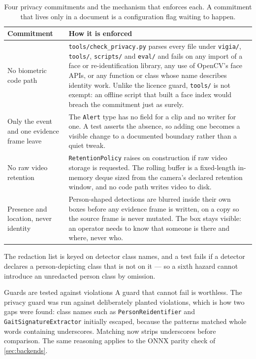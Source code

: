 \begin{table}[htbp]
\centering\small
\caption{Four privacy commitments and the mechanism that enforces each. A
commitment that lives only in a document is a configuration flag waiting to
happen.}
\label{tab:privacy}
\begin{tabularx}{\textwidth}{p{4.1cm} L}
\toprule
Commitment & How it is enforced \\
\midrule
No biometric code path &
\texttt{tools/check\_privacy.py} parses every file under \texttt{vigia/},
\texttt{tools/}, \texttt{scripts/} and \texttt{eval/} and fails on any import
of a face or re-identification library, any use of OpenCV's face APIs, or any
function or class whose name describes identity work. Unlike the licence
guard, \texttt{tools/} is not exempt: an offline script that built a face
index would breach the commitment just as surely. \\
\addlinespace
Only the event and one evidence frame leave &
The \texttt{Alert} type has no field for a clip and no writer for one. A test
asserts the absence, so adding one becomes a visible change to a documented
boundary rather than a quiet tweak. \\
\addlinespace
No raw video retention &
\texttt{RetentionPolicy} raises on construction if raw video storage is
requested. The rolling buffer is a fixed-length in-memory deque sized from the
camera's declared retention window, and no code path writes video to disk. \\
\addlinespace
Presence and location, never identity &
Person-shaped detections are blurred inside their own boxes before any
evidence frame is written, on a copy so the source frame is never mutated. The
box stays visible: an operator needs to know that someone is there and where,
never who. \\
\bottomrule
\end{tabularx}
\end{table}

The redaction list is keyed on detector class names, and a test fails if a
detector declares a person-depicting class that is not on it — so a sixth
hazard cannot introduce an unredacted person class by omission.

\begin{recorded}{Guards are tested against violations}
A guard that cannot fail is worthless. The privacy guard was run against
deliberately planted violations, which is how two gaps were found: class names
such as \texttt{PersonReidentifier} and \texttt{GaitSignatureExtractor}
initially escaped, because the patterns matched whole words containing
underscores. Matching now strips underscores before comparison. The same
reasoning applies to the ONNX parity check of \cref{sec:backends}.
\end{recorded}

